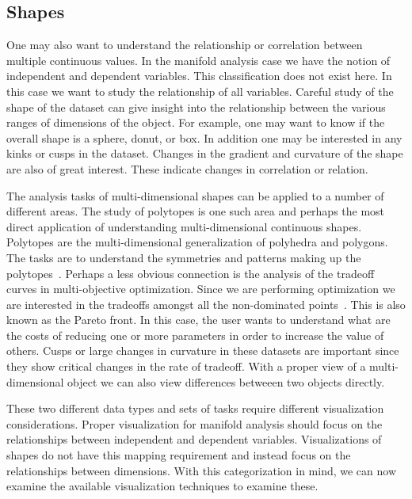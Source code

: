 \subsection{Shapes}
\label{sec:shapes}

One may also want to understand the relationship or correlation between
multiple continuous values. In the manifold analysis case we have the notion
of independent and dependent variables. This classification does not exist 
here.
In this case
we want to study the relationship of all variables. Careful study of the shape
of the dataset can give insight into the relationship between the various
ranges of dimensions of the object. For example, one may want to know if the
overall shape is a sphere, donut, or box. In addition one may be interested in
any kinks or cusps in the dataset. Changes in the gradient and curvature of
the shape are also of great interest. These indicate changes in correlation or
relation.

The analysis tasks of multi-dimensional shapes can be applied to a number of
different areas. The study of polytopes is one such area and perhaps the most
direct application of understanding multi-dimensional continuous shapes.
Polytopes are the multi-dimensional generalization of polyhedra and polygons.
The tasks are to understand the symmetries and patterns making up the
polytopes~\cite{Ziegler:2012}. Perhaps a less obvious connection is the
analysis of the tradeoff curves in multi-objective optimization. Since we are
performing optimization we are interested in the tradeoffs amongst all the
non-dominated points~\cite{Kung:1975}. This is also known as the Pareto
front. In this case, the user wants to understand what are the costs of
reducing one or more parameters in order to increase the value of others. Cusps
or large changes in curvature in these datasets are important since they show
critical changes in the rate of tradeoff.  With a proper view of a
multi-dimensional object we can also view differences betweeen two objects
directly. 

These two different data types and sets of tasks require different visualization
considerations. Proper visualization for manifold analysis should focus on
the relationships between independent and dependent variables. Visualizations
of shapes do not have this mapping requirement and instead focus on the 
relationships between dimensions. With this categorization in mind, we can now
examine the available visualization techniques to examine these.

